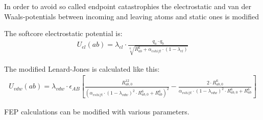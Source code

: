 \documentclass[10pt,a4paper]{article} %
\begin{document}
	In order to avoid so called endpoint catastrophies the electrostatic and van der Waals-potentials between incoming and leaving atoms and static ones is modified \supercite{chipot_free_2007}
	
	The softcore electrostatic potential is:\supercite{becker_development_2015}
	\begin{align}
U_{el}(ab) = \lambda_{el} \cdot \frac{q_a \cdot q_b}{\sqrt[6]{R_{ab}^6 + \alpha_{cshift} \cdot (1-\lambda_{el})}} \label{cb_softcore}
\end{align}

The modified Lenard-Jones is calculated like this:\supercite{beutler_avoiding_1994}
\begin{align}
U_{vdw}(ab) = \lambda_{vdw} \cdot \epsilon_{AB} \left[ \frac{R_{ab,0}^{12}}{\left(\alpha_{vshift} \cdot (1-\lambda_{vdw})^2 \cdot R_{ab,0}^6 + R_{ab}^6 \right)^2}  -  \frac{2 \cdot R_{ab,0}^6}{\alpha_{vshift} \cdot (1-\lambda_{vdw})^2 \cdot R_{ab,0}^6 + R_{ab}^6}  \right] \label{LJ_softcore}
\end{align}
	
	
	\ac{FEP} calculations can be modified with various parameters.
\end{document}
